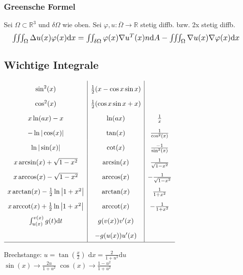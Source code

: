 \begin{emphbox}
    \subsubsection{Greensche Formel}
    Sei $\Omega \subset \mathbb R^3$ und $\delta\Omega$ wie oben. Sei $\varphi,u : \overline{\Omega}\rightarrow \mathbb R$ stetig diffb. bzw. 2x stetig diffb.
    \begin{equation*}
        \resizebox{\hsize}{!}
        {
            $\iiint_\Omega \Delta u(x) \varphi(x)\mathrm dx=\iint_{\delta \Omega}\varphi(x)\nabla u^T(x)n\mathrm dA - \iiint_\Omega \nabla u(x)\nabla \varphi(x)\mathrm dx$
        }
    \end{equation*}
\end{emphbox}

\subsection{Wichtige Integrale}
\begin{math}\renewcommand{\arraystretch}{1.8}
    \begin{array}{c|c|c}
        \sin^2(x)                                           & \frac{1}{2}(x - \cos x \sin x)     &                                          \\
        \cos^2(x)                                           & \frac{1}{2}(\cos x \sin x + x)   &                                          \\
        x\ln(ax) -x                                         & \ln(ax)                   & \textstyle \frac{1}{x}                   \\
        -\ln |\cos(x)|                                      & \tan(x)                   & \frac{1}{\cos^2(x)}                      \\
        \ln |\sin(x)|                                       & \cot(x)                   & \frac{-1}{\sin^2(x)}                     \\
        x\arcsin (x)+\sqrt{1-x^2}                           & \arcsin(x)                & \frac{1}{\sqrt{1-x^2}}                   \\
        x\arccos (x)-\sqrt{1-x^2}                           & \arccos(x)                & -\frac{1}{\sqrt{1-x^2}}                  \\
        x\arctan (x)-\frac{1}{2} \ln \left| 1+ x^2 \right|  & \arctan (x)               & \frac{1}{1+x^2}                          \\
        x\arccot (x)+\frac{1}{2} \ln \left| 1+ x^2 \right|  & \arccot (x)               & -\frac{1}{1+x^2}                         \\
        \int_{u(x)}^{v(x)}g(t) \mathrm dt                   & g(v(x))v'(x)              &                                          \\
                                                            & -g(u(x))u'(x)             &                                          \\ \hline
    \end{array}
\end{math}

Brechstange: $u=\tan(\frac{x}{2})$ \quad $\mathrm dx = \frac{2}{1+u^2} \mathrm du$ \\ $\sin(x) \rightarrow \frac{2u}{1+u^2}$ \qquad $\cos(x) \rightarrow \frac{1-u^2}{1+u^2}$